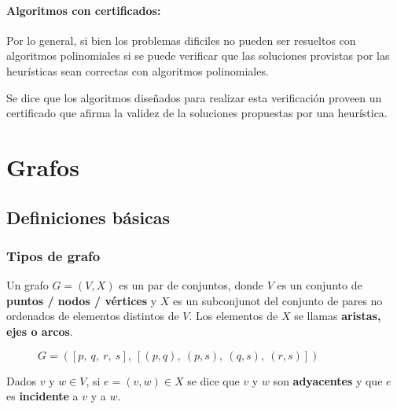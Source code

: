 \paragraph{Algoritmos con certificados:} Por lo general, si bien los problemas dificiles no pueden ser resueltos con algoritmos polinomiales si se puede verificar que las soluciones provistas por las heurísticas sean correctas con algoritmos polinomiales. 

Se dice que los algoritmos diseñados para realizar esta verificación proveen un certificado que afirma la validez de la soluciones propuestas por una heurística.

\printbibliography[keyword=intro,title={Bibliografía}]

\newpage
\section{Grafos}
\subsection{Definiciones básicas}
\subsubsection{Tipos de grafo}
Un grafo \(G = (V,X)\) es un par de conjuntos, donde \(V\) es un conjunto de \textbf{puntos / nodos / vértices} y \(X\) es un subconjunot del conjunto de pares no ordenados de elementos distintos de \(V\). Los elementos de \(X\) se llamas \textbf{aristas, ejes o arcos}.

\begin{figure}
\begin{center}

\end{center}
	\caption{\(G =([p,~q,~r,~s],~[(p,q),~(p,s),~(q,s),~(r,s)])\)
	}
\end{figure}

Dados \(v\) y \(w \in V\), si \(e=(v,w)\in X\) se dice que \(v\) y \(w\) son \textbf{adyacentes} y que \(e\) es \textbf{incidente} a \(v\) y a \(w\).

